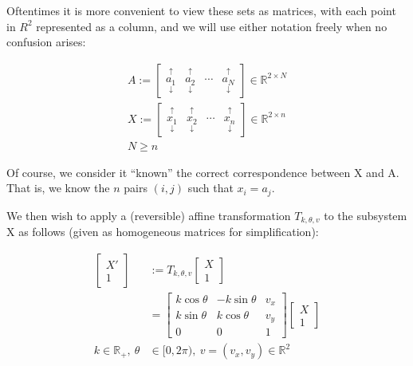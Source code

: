 \documentclass[10pt,twocolumn]{article}
\providecommand{\R}{\mathbb{R}}%
\newcommand*\mcol[1]{\overset{\uparrow}{\underset{\downarrow}{#1}}}
\begin{document}
{Oftentimes it is more convenient to view these sets as matrices, with each
point in $R^2$ represented as a column, and we will use either notation freely
when no confusion arises: 

\begin{subequations}
  \begin{align}
    A := \begin{bmatrix}
      \mcol{a_1} & \mcol{a_2} & \cdots   & \mcol{a_N}
    \end{bmatrix} \in \R^{2\times N}\\
    X := \begin{bmatrix}
      \mcol{x_1}    & \mcol{x_2}    & \cdots   & \mcol{x_n}
    \end{bmatrix} \in \R^{2\times n}\\
    N \geq n
  \end{align}
\end{subequations}

Of course, we consider it ``known'' the correct correspondence between X and A. That
is, we know the $n$ pairs $(i,j)$ such that $x_i = a_j$.

We then wish to apply a (reversible) affine transformation $T_{k, \theta, v}$
to the subsystem X as follows (given as homogeneous matrices for
simplification):

\begin{equation}
  \begin{aligned}
    \begin{bmatrix}X' \\ 1\end{bmatrix} &:=  T_{k, \theta, v} \begin{bmatrix}X \\ 1\end{bmatrix} \\
    &= \begin{bmatrix}
  k\cos\theta & -k\sin\theta & v_x \\
  k\sin\theta & k\cos\theta & v_y \\
  0             &   0 & 1
\end{bmatrix} \begin{bmatrix}X\\1\end{bmatrix} \\
k \in \R_+, \ \theta &\in [0, 2\pi),  \ v = (v_x, v_y) \in \R^2
\end{aligned}
\end{equation}

}
\end{document}
